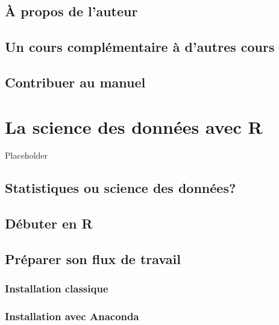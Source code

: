 \documentclass[]{book}
\begin{document}
\hypertarget{uxe0-propos-de-lauteur}{%
\section{À propos de l'auteur}\label{uxe0-propos-de-lauteur}}

\hypertarget{un-cours-compluxe9mentaire-uxe0-dautres-cours}{%
\section{Un cours complémentaire à d'autres
cours}\label{un-cours-compluxe9mentaire-uxe0-dautres-cours}}

\hypertarget{contribuer-au-manuel}{%
\section{Contribuer au manuel}\label{contribuer-au-manuel}}

\hypertarget{chapitre-intro-a-R}{%
\chapter{La science des données avec R}\label{chapitre-intro-a-R}}

Placeholder

\hypertarget{statistiques-ou-science-des-donnuxe9es}{%
\section{Statistiques ou science des
données?}\label{statistiques-ou-science-des-donnuxe9es}}

\hypertarget{duxe9buter-en-r}{%
\section{Débuter en R}\label{duxe9buter-en-r}}

\hypertarget{pruxe9parer-son-flux-de-travail}{%
\section{Préparer son flux de
travail}\label{pruxe9parer-son-flux-de-travail}}

\hypertarget{installation-classique}{%
\subsection{Installation classique}\label{installation-classique}}

\hypertarget{installation-avec-anaconda}{%
\subsection{Installation avec
Anaconda}\label{installation-avec-anaconda}}
\end{document}
